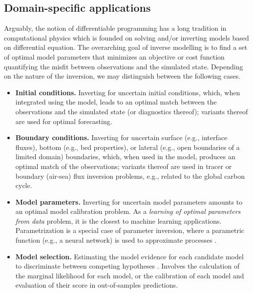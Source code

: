 \subsection{Domain-specific applications}

Arguably, the notion of differentiable programming has a long tradition in computational physics which is founded on solving and/or inverting models based on differential equation.
The overarching goal of inverse modelling is to find a set of optimal model parameters that minimizes an objective or cost function quantifying the misfit between observations and the simulated state.
Depending on the nature of the inversion, we may distinguish between the following cases.
\begin{itemize}
    \item \textbf{Initial conditions.} Inverting for uncertain initial conditions, which, when integrated using the model, leads to an optimal match between the observations and the simulated state (or diagnostics thereof); variants thereof are used for optimal forecasting.
    \item \textbf{Boundary conditions.} Inverting for uncertain surface (e.g., interface fluxes), bottom (e.g., bed properties), or lateral (e.g., open boundaries of a limited domain) boundaries, which, when used in the model, produces an optimal match of the observations; variants thereof are used in tracer or boundary (air-sea) flux inversion problems, e.g., related to the global carbon cycle.
    \item \textbf{Model parameters.} Inverting for uncertain model parameters amounts to an optimal model calibration problem. As a \textit{learning of optimal parameters from data} problem, it is the closest to machine learning applications. Parametrization is a special case of parameter inversion, where a parametric function (e.g., a neural network) is used to approximate processes \cite{rasp2018,beucler2024,boussange2024}.
    \item \textbf{Model selection.} Estimating the model evidence for each candidate model to discriminate between competing hypotheses \cite{burnham2004}. Involves the calculation of the marginal likelihood for each model, or the calibration of each model and evaluation of their score in out-of-samples predictions. %
\end{itemize}
